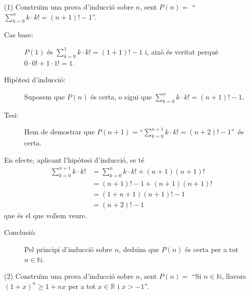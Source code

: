 \begin{solucio}
(1) Constru\"{\i}m una prova d'inducci\'{o} sobre $n$, sent $P(n)=$
\textquotedblleft$%
{\displaystyle\sum\limits_{k=0}^{n}}
k\cdot k!=\left(  n+1\right)  !-1$\textquotedblright.

\begin{description}
\item[Cas base:] $P(1)$ \'{e}s $%
{\displaystyle\sum\limits_{k=0}^{1}}
k\cdot k!=\left(  1+1\right)  !-1$ i, aix\`{o} \'{e}s veritat perqu\`{e}
$0\cdot0!+1\cdot1!=1$.

\item[Hip\`{o}tesi d'inducci\'{o}:] Suposem que $P(n)$ \'{e}s certa, o sigui
que $%
{\displaystyle\sum\limits_{k=0}^{n}}
k\cdot k!=\left(  n+1\right)  !-1$.

\item[Tesi:] Hem de demostrar que $P(n+1)=$\textquotedblleft$%
{\displaystyle\sum\limits_{k=0}^{n+1}}
k\cdot k!=\left(  n+2\right)  !-1$\textquotedblright\ \'{e}s certa.
\end{description}

En efecte, aplicant l'hip\`{o}tesi d'inducci\'{o}, es t\'{e}%
\begin{align*}%
{\displaystyle\sum\limits_{k=0}^{n+1}}
k\cdot k!  &  =%
{\displaystyle\sum\limits_{k=0}^{n}}
k\cdot k!+(n+1)(n+1)!\\
&  =\left(  n+1\right)  !-1+(n+1)(n+1)!\\
&  =(1+n+1)(n+1)!-1\\
&  =(n+2)!-1
\end{align*}
que \'{e}s el que vol\'{\i}em veure.

\begin{description}
\item[Conclusi\'{o}:] Pel principi d'inducci\'{o} sobre $n$, dedu\"{\i}m que
$P(n)$ \'{e}s certa per a tot $n\in\mathbb{N}$.
\end{description}

(2) Constru\"{\i}m una prova d'inducci\'{o} sobre $n$, sent $P(n)=$
\textquotedblleft Si $n\in\mathbb{N}$, llavors $\left(  1+x\right)  ^{n}%
\geq1+nx$ per a tot $x\in\mathbb{R}$ i $x>-1$\textquotedblright.


\end{solucio}
